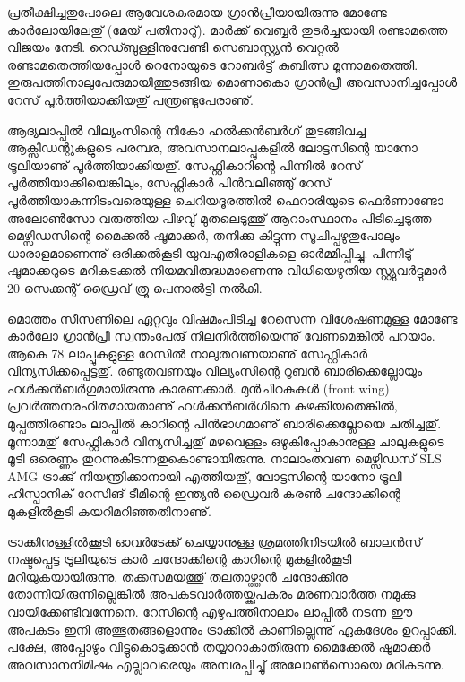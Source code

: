﻿
\vskip 2pt

പ്രതീക്ഷിച്ചതുപോലെ ആവേശകരമായ ഗ്രാന്‍പ്രീയായിരുന്നു മോണ്ടേ കാര്‍ലോയിലേതു് (മേയ് പതിനാറു്). മാര്‍ക്ക് 
വെബ്ബര്‍ തുടര്‍ച്ചയായി രണ്ടാമത്തെ വിജയം നേടി. റെഡ്ബുള്ളിനുവേണ്ടി സെബാസ്റ്റ്യന്‍ വെറ്റല്‍ രണ്ടാമതെത്തിയപ്പോള്‍ 
റെനോയുടെ റോബര്‍ട്ട് കുബിത്സ മൂന്നാമതെത്തി. ഇരുപത്തിനാലുപേരുമായിത്തുടങ്ങിയ മൊണാകൊ ഗ്രാന്‍പ്രീ 
അവസാനിച്ചപ്പോള്‍ റേസ് പൂര്‍ത്തിയാക്കിയതു് പന്ത്രണ്ടുപേരാണു്.

ആദ്യലാപ്പില്‍ വില്യംസിന്റെ നികോ ഹല്‍ക്കന്‍ബര്‍ഗ് തുടങ്ങിവച്ച ആക്സിഡന്റുകളുടെ പരമ്പര, അവസാനലാപ്പുകളില്‍ 
ലോട്ടസിന്റെ യാനോ ട്രൂലിയാണു് പൂര്‍ത്തിയാക്കിയതു്. സേഫ്റ്റികാറിന്റെ പിന്നില്‍ റേസ് പൂര്‍ത്തിയാക്കിയെങ്കിലും, 
സേഫ്റ്റികാര്‍ പിന്‍വലിഞ്ഞു് റേസ് പൂര്‍ത്തിയാകുന്നിടംവരെയുള്ള ചെറിയദൂരത്തില്‍ ഫെറാരിയുടെ ഫെര്‍ണാണ്ടോ 
അലോണ്‍സോ വരുത്തിയ പിഴവു് മുതലെടുത്തു് ആറാംസ്ഥാനം പിടിച്ചെടുത്ത മെഴ്സിഡസിന്റെ മൈക്കല്‍ ഷൂമാക്കര്‍,
തനിക്കു കിട്ടുന്ന സൂചിപ്പഴുതുപോലും ധാരാളമാണെന്നു് ഒരിക്കല്‍കൂടി യുവഎതിരാളികളെ ഓര്‍മ്മിപ്പിച്ചു. പിന്നീടു് ഷൂമാക്കറുടെ 
മറികടക്കല്‍ നിയമവിരുദ്ധമാണെന്നു വിധിയെഴുതിയ സ്റ്റ്യുവര്‍ട്ടുമാര്‍ 20 സെക്കന്റ് ഡ്രൈവ് ത്രൂ പെനാല്‍ട്ടി നല്‍കി.

മൊത്തം സീസണിലെ ഏറ്റവും വിഷമംപിടിച്ച റേസെന്ന വിശേഷണമുള്ള മോണ്ടേ കാര്‍ലോ ഗ്രാന്‍പ്രീ സ്വന്തംപേരു് 
നിലനിര്‍ത്തിയെന്നു് വേണമെങ്കില്‍ പറയാം. ആകെ 78 ലാപ്പുകളുള്ള റേസില്‍ നാലുതവണയാണു് സേഫ്റ്റികാര്‍ 
വിന്യസിക്കപ്പെട്ടതു്. രണ്ടുതവണയും വില്യംസിന്റെ റൂബന്‍ ബാരിക്കെല്ലോയും ഹള്‍ക്കന്‍ബര്‍ഗുമായിരുന്നു കാരണക്കാര്‍. 
മുന്‍ചിറകുകള്‍ (front wing) പ്രവര്‍ത്തനരഹിതമായതാണു് ഹള്‍ക്കന്‍ബര്‍ഗിനെ കുഴക്കിയതെങ്കില്‍, മുപ്പത്തിരണ്ടാം 
ലാപ്പില്‍ കാറിന്റെ പിന്‍ഭാഗമാണു് ബാരിക്കെല്ലോയെ ചതിച്ചതു്. മൂന്നാമതു് സേഫ്റ്റികാര്‍ വിന്യസിച്ചതു് മഴവെള്ളം 
ഒഴുകിപ്പോകാനുള്ള ചാലുകളുടെ മൂടി ഒരെണ്ണം തുറന്നുകിടന്നതുകൊണ്ടായിരുന്നു. നാലാംതവണ മെഴ്സിഡസ് 
SLS AMG ട്രാക്കു് നിയന്ത്രിക്കാനായി എത്തിയതു്, ലോട്ടസിന്റെ യാനോ ട്രൂലി ഹിസ്പാനിക് റേസിങ് ടീമിന്റെ ഇന്ത്യന്‍ 
ഡ്രൈവര്‍ കരണ്‍ ചന്ദോക്കിന്റെ മുകളില്‍കൂടി കയറിമറിഞ്ഞതിനാണു്.

ട്രാക്കിനുള്ളില്‍ക്കൂടി ഓവര്‍ടേക്ക് ചെയ്യാനുള്ള ശ്രമത്തിനിടയില്‍ ബാലന്‍സ് നഷ്ടപ്പെട്ട ട്രൂലിയുടെ കാര്‍ ചന്ദോക്കിന്റെ 
കാറിന്റെ മുകളില്‍കൂടി മറിയുകയായിരുന്നു. തക്കസമയത്തു് തലതാഴ്ത്താന്‍ ചന്ദോക്കിനു തോന്നിയിരുന്നില്ലെങ്കില്‍ 
അപകടവാര്‍ത്തയ്ക്കുപകരം മരണവാര്‍ത്ത നമുക്കു വായിക്കേണ്ടിവന്നേനെ. റേസിന്റെ എഴുപത്തിനാലാം 
ലാപ്പില്‍ നടന്ന ഈ അപകടം ഇനി അത്ഭുതങ്ങളൊന്നും ട്രാക്കില്‍ കാണില്ലെന്നു് ഏകദേശം ഉറപ്പാക്കി. പക്ഷേ, അപ്പോഴും 
വിട്ടുകൊടുക്കാന്‍ തയ്യാറാകാതിരുന്ന മൈക്കേല്‍ ഷൂമാക്കര്‍ അവസാനനിമിഷം എല്ലാവരെയും അമ്പരപ്പിച്ചു് 
അലോണ്‍സൊയെ മറികടന്നു.


